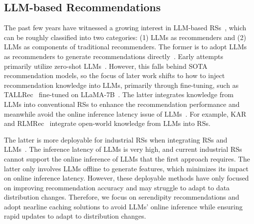\subsection{LLM-based Recommendations}
The past few years have witnessed a growing interest in LLM-based RSs~\cite{li2023large,zhu2023large,chen2023large,fan2023recommender,wu2023survey,liu2023pre,yu2023self,lin2023can}, which can be roughly classified into two categories: (1) LLMs as recommenders and (2) LLMs as components of traditional recommenders. The former is to adopt LLMs as recommenders to generate recommendations directly~\cite{xi2024memocrs,chatrec,xi2024play,lin2024rella,bao2023tallrec,zheng2024adapting,zhu2024collaborative,zheng2024harnessing,dong2024unsupervised,tan2024idgenrec,wu2024coral,kim2024large,wang2024eager,lin2024bridging}. Early attempts primarily utilize zero-shot LLMs~\cite{chatrec,xi2024memocrs}. 
However, this falls behind SOTA recommendation models, so the focus of later work shifts to how to inject recommendation knowledge into LLMs, primarily through fine-tuning, such as TALLRec~\cite{bao2023tallrec} fine-tuned on LLaMA-7B~\cite{llama}. 
The latter integrates knowledge from LLMs into conventional RSs to enhance the recommendation performance and meanwhile avoid the online inference latency issue of LLMs~\cite{xi2023towards,lyu2023llm,ren2024representation,xi2024efficient,xi2024decoding,liu2024once,ren2024enhancing,du2024disco,tian2024reland,wang2024can}. For example, KAR~\cite{xi2023towards} and RLMRec~\cite{ren2024representation} integrate open-world knowledge from LLMs into RSs. 


The latter is more deployable for industrial RSs when integrating RSs and LLMs~\cite{xi2023towards,zhang2024notellm,xi2024decoding,luo2024kellmrec}. The inference latency of LLMs is very high, and current industrial RSs cannot support the online inference of LLMs that the first approach requires. The latter only involves LLMs offline to generate features, which minimizes its impact on online inference latency. However, these deployable methods have only focused on improving recommendation accuracy and may struggle to adapt to data distribution changes. Therefore, we focus on serendipity recommendations and adopt nearline caching solutions to avoid LLMs' online inference while ensuring rapid updates to adapt to distribution changes.
